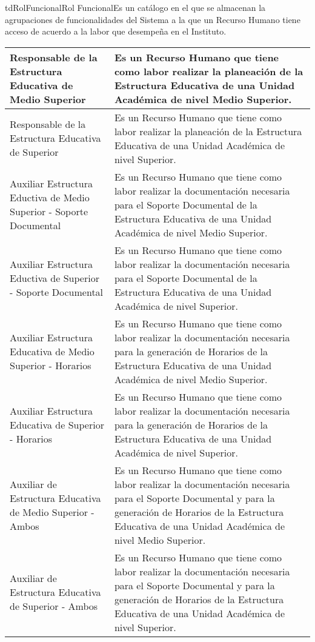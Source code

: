 \begin{TipoDeDato}{tdRolFuncional}{Rol Funcional}{Es un catálogo en el que se almacenan la agrupaciones de funcionalidades del Sistema a la que un Recurso Humano tiene acceso de acuerdo a la labor que desempeña en el Instituto.}
\begin{longtable}{| p{}| p{}|}
			\hline
			Responsable de la Estructura Educativa de Medio Superior & Es un Recurso Humano que tiene como labor realizar la planeación de la Estructura Educativa de una Unidad Académica de nivel Medio Superior.	\\
			\hline
			Responsable de la Estructura Educativa de Superior & Es un Recurso Humano que tiene como labor realizar la planeación de la Estructura Educativa de una Unidad Académica de nivel Superior.\\
			\hline	
			Auxiliar Estructura Eductiva de Medio Superior - Soporte Documental & Es un Recurso Humano que tiene como labor realizar la documentación necesaria para el Soporte Documental  de la Estructura Educativa de una Unidad Académica de nivel Medio Superior.\\
			\hline
			Auxiliar Estructura Eductiva de Superior - Soporte Documental & Es un Recurso Humano que tiene como labor realizar la documentación necesaria para el Soporte Documental  de la Estructura Educativa de una Unidad Académica de nivel Superior.\\
			\hline
			Auxiliar Estructura Educativa de Medio Superior - Horarios & Es un Recurso Humano que tiene como labor realizar la documentación necesaria para la generación de Horarios de la Estructura Educativa de una Unidad Académica de nivel Medio Superior.\\
			\hline
			Auxiliar Estructura Educativa de Superior - Horarios & Es un Recurso Humano que tiene como labor realizar la documentación necesaria para la generación de Horarios de la Estructura Educativa de una Unidad Académica de nivel Superior.\\
			\hline
			Auxiliar de Estructura Educativa de Medio Superior - Ambos & Es un Recurso Humano que tiene como labor realizar la documentación necesaria para el Soporte Documental y para la generación de Horarios de la Estructura Educativa de una Unidad Académica de nivel Medio Superior.\\
			\hline
			Auxiliar de Estructura Educativa de Superior - Ambos & Es un Recurso Humano que tiene como labor realizar la documentación necesaria para el Soporte Documental y para la generación de Horarios de la Estructura Educativa de una Unidad Académica de nivel Superior.\\
			\hline
	 		\end{longtable}
\end{TipoDeDato}